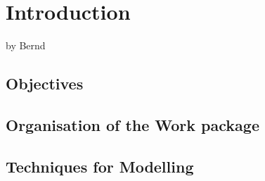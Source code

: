 \section*{Introduction}

by Bernd

\subsection*{Objectives}


\subsection*{Organisation of the Work package}


\subsection*{Techniques for Modelling}



